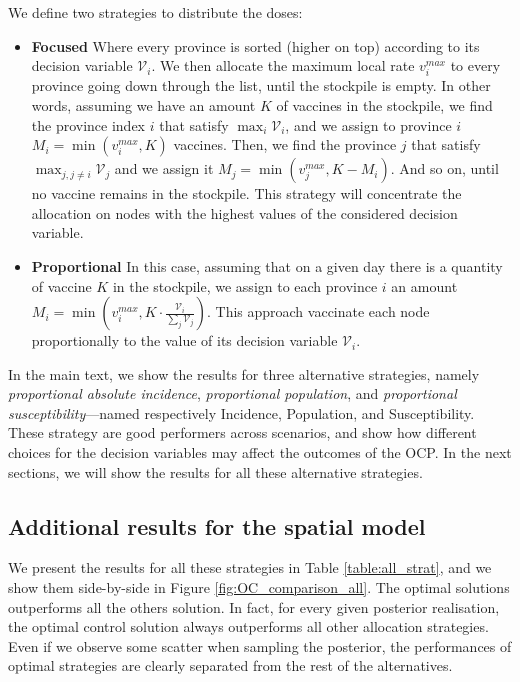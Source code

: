 We define two strategies to distribute the doses:
\begin{itemize}
\item \textbf{Focused} Where every province is sorted (higher on top) according to its decision variable $\mathcal{V}_i$. We then allocate the maximum local rate $v_i^{max}$ to every province going down through the list, until the stockpile is empty. In other words, assuming we have an amount $K$ of vaccines in the stockpile, we find the province index $i$ that satisfy $\max_i \mathcal{V}_i$, and we assign to province $i$ $M_i = \min(v_i^{max}, K)$ vaccines. Then, we find the province $j$ that satisfy $\max_{j,j\neq i} \mathcal{V}_j$ and we assign it $M_j = \min(v_j^{max}, K-M_i)$. And so on, until no vaccine remains in the stockpile. This strategy will concentrate the allocation on nodes with the highest values of the considered decision variable.
\item \textbf{Proportional} In this case, assuming that on a given day there is a quantity of vaccine $K$ in the stockpile, we assign to each province $i$ an amount $M_i = \min(v_i^{max}, K \cdot \frac{\mathcal{V}_i}{\sum_j \mathcal{V}_j})$. This approach vaccinate each node proportionally to the value of its decision variable $\mathcal{V}_i$.
\end{itemize}
In the main text, we show the results for three alternative strategies, namely \textit{proportional absolute incidence}, \textit{proportional population}, and \textit{proportional susceptibility}---named respectively Incidence, Population, and Susceptibility. These strategy are good performers across scenarios, and show how different choices for the decision variables may affect the outcomes of the OCP. In the next sections, we will show the results for all these alternative strategies.

\subsection*{Additional results for the spatial model}
We present the results for all these strategies in Table \ref{table:all_strat}, and we show them side-by-side in Figure \ref{fig:OC_comparison_all}. The optimal solutions outperforms all the others solution. In fact, for every given posterior realisation, the optimal control solution always outperforms all other allocation strategies. Even if we observe some scatter when sampling the posterior, the performances of optimal strategies are clearly separated from the rest of the alternatives.


